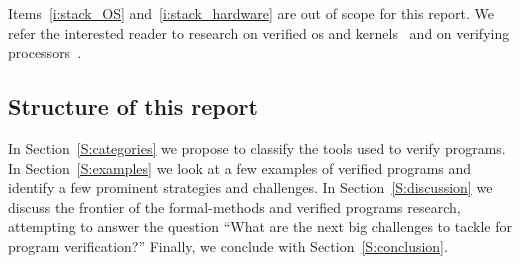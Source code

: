 Items~\ref{i:stack_OS} and~\ref{i:stack_hardware} are out of scope for this
report. We refer the interested reader to research on verified \gls{os} and
kernels~\cite{Klein_EHACDEEKNSTW_09,Klein_AEHCDEEKNSTW_10,Klein_AEMSKH_14,Sewell_KH_16,Narayanan_2019,Narayan_2020,Nelson_2017}
and on verifying
processors~\cite{sturton-memocode13,Sturton_2013,Bradfield_2016,zhang2017identifying,zhang2018recursive,zhang2018end}.

\subsection{Structure of this report}

In Section~\ref{S:categories} we propose to classify the tools used to verify
programs. In Section~\ref{S:examples} we look at a few examples of verified
programs and identify a few prominent strategies and challenges. In
Section~\ref{S:discussion} we discuss the frontier of the formal-methods and
verified programs research, attempting to answer the question ``What are the
next big challenges to tackle for program verification?'' Finally, we conclude
with Section~\ref{S:conclusion}.
